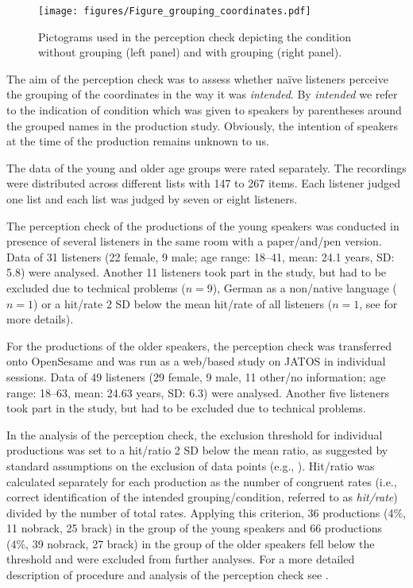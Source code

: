 \documentclass[output=paper]{langscibook}
\begin{document}
\begin{figure}
    \centering
    \texttt{[image: figures/Figure\_grouping\_coordinates.pdf]}
    \caption{Pictograms used in the perception check depicting the condition without grouping (left panel) and with grouping (right panel).}
    \label{fig:grouping_perception}
\end{figure}

The aim of the perception check was to assess whether na\"ive listeners perceive the grouping of the coordinates in the way it was \textit{intended}. By \textit{intended} we refer to the indication of condition which was given to speakers by parentheses around the grouped names in the production study. Obviously, the intention of speakers at the time of the production remains unknown to us.

The data of the young and older age groups were rated separately. The recordings were distributed across different lists with 147 to 267 items. Each listener judged one list and each list was judged by seven or eight listeners.

The perception check of the productions of the young speakers was conducted in presence of several listeners in the same room with a paper\-/and\-/pen version. Data of 31 listeners (22 female, 9 male; age range: 18--41, mean: 24.1 years, SD: 5.8) were analysed. Another 11 listeners took part in the study, but had to be excluded due to technical problems ($n=9$), German as a non\-/native language ($n=1$) or a hit\-/rate 2 SD below the mean hit\-/rate of all listeners ($n=1$, see \citealt{huttenlauchetal2021} for more details).

For the productions of the older speakers, the perception check was transferred onto OpenSesame \citep{mathot2012opensesame} and was run as a web\-/based study on JATOS \citep{lange2015_jatos} in individual sessions. Data of 49 listeners (29 female, 9 male, 11 other/no information; age range: 18--63, mean: 24.63 years, SD: 6.3) were analysed. Another five listeners took part in the study, but had to be excluded due to technical problems. 

In the analysis of the perception check, the exclusion threshold for individual productions was set to a hit\-/ratio 2 SD below the mean ratio, as suggested by standard assumptions on the exclusion of data points (e.g., \citealt{howell_statistical_1998}). Hit\-/ratio was calculated separately for each production as the number of congruent rates (i.e., correct identification of the intended grouping/condition, referred to as \textit{hit\-/rate}) divided by the number of total rates. Applying this criterion, 36 productions (4\%, 11 nobrack, 25 brack) in the group of the young speakers and 66 productions (4\%, 39 nobrack, 27 brack) in the group of the older speakers fell below the threshold and were excluded from further analyses. 
For a more detailed description of procedure and analysis of the perception check see \citet{huttenlauchetal2021}.
\end{document}
